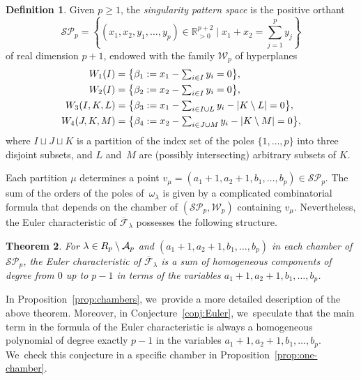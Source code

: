 \documentclass[JEP,XML,SOM,Unicode,NoFloatCountersInSection,published]{cedram}
\let\ts\textstyle
\newtheorem{thm}{Theorem}[section]
\theoremstyle{definition}
\newtheorem{defn}[thm]{Definition}
\begin{document}
\begin{defn}\label{defn:SPS}
Given $p \geq 1$, the \textit{singularity pattern space} is the positive orthant
\[
\mathcal{SP}_{p}=\left\{ (x_{1},x_{2},y_{1},\dots,y_{p}) \in \mathbb{R}_{>0}^{p+2} \mid x_{1}+x_{2}= \ts\sum_{j=1}^p y_{j} \right\}
\]
of real dimension $p+1$, endowed with the family $\mathcal{W}_{p}$ of hyperplanes
\begin{align}\label{eq:hyptype1}
&\hspace*{-.95cm}\begin{aligned}
W_{1}(I)&=\bigl\{\beta_{1}:=x_{1} - \ts\sum_{i \in I} y_{i} = 0\bigr\},\\
W_{2}(I)&=\bigl\{\beta_{2}:=x_{2} - \ts\sum_{i \in I} y_{i} = 0\bigr\},
\end{aligned}\\
\label{eq:hyptype2}
W_{3}(I,K,L)&=\bigl\{\beta_{3}:=x_{1} - \ts\sum_{i \in I \cup L} y_{i} -|K \setminus L| = 0\bigr\},\\
\label{eq:hyptype3}
W_{4}(J,K,M)&=\bigl\{\beta_{4}:=x_{2} - \ts\sum_{i \in J \cup M} y_{i} -|K \setminus M| = 0\bigr\},
\end{align}
where $I \sqcup J \sqcup K$ is a partition of the index set of the poles $\lbrace{1,\dots,p \rbrace}$ into three disjoint subsets, and $L$ and~$M$ are (possibly intersecting) arbitrary subsets of $K$.
\end{defn}

Each partition $\mu$ determines a point $v_{\mu}=(a_{1}+1,a_{2}+1,b_{1},\dots,b_{p})\in \mathcal{SP}_{p}$. The sum of the orders of the poles of~$\omega_{\lambda}$ is given by a complicated combinatorial formula that depends on the chamber of $(\mathcal{SP}_{p},\mathcal{W}_{p})$ containing $v_{\mu}$. Nevertheless, the Euler characteristic of $\overline{\mathcal F}_\lambda$ possesses the following structure.

\begin{thm}\label{thm:chambers}
For $\lambda \in \mathcal \mathcal{R}_{p} \setminus \mathcal{A}_{p}$ and $(a_1+1, a_2+1, b_1, \ldots, b_p)$ in each chamber of $\mathcal{SP}_p$, the Euler characteristic of $\overline{\mathcal F}_\lambda$ is a sum of homogeneous components of degree from $0$ up to $p-1$ in terms of the variables $a_{1}+1,a_{2}+1,b_{1},\dots,b_{p}$.
\end{thm}
In Proposition~\ref{prop:chambers}, we~provide a more detailed description of the above theorem. Moreover, in Conjecture~\ref{conj:Euler}, we~speculate that the main term in the formula of the Euler characteristic is always a homogeneous polynomial of degree exactly $p-1$ in the variables $a_{1}+1,a_{2}+1,b_{1},\dots,b_{p}$. We~check this conjecture in a specific chamber in Proposition~\ref{prop:one-chamber}.
\end{document}
